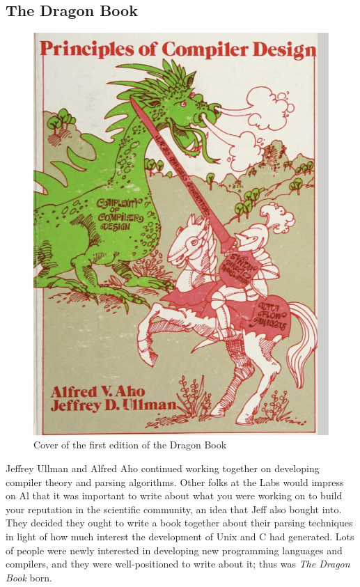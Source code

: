 \subsection{The Dragon Book}

\begin{figure}[h]
	\centering
	\includegraphics[height=0.3\textheight]{resource/software/unix/dragon-book-1ed.png}
	\caption{Cover of the first edition of the Dragon Book}
	\label{fig:dragon-book}
\end{figure}

Jeffrey Ullman and Alfred Aho continued working together on
developing compiler theory and parsing algorithms.
Other folks at the Labs would impress on Al that it was important to write
about what you were working on to build your reputation in the
scientific community, an idea that Jeff also bought into.
They decided they ought to write a book together about their parsing
techniques in light of how much interest the development of Unix and C
had generated. Lots of people were newly interested in developing new
programming languages and compilers, and they were well-positioned to
write about it; thus was \textit{The Dragon Book} born.

